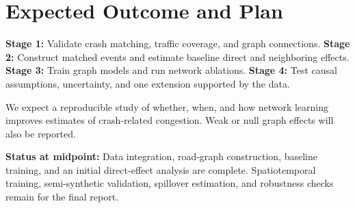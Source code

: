 \documentclass[sigconf,nonacm]{acmart}
\begin{document}
\section{Expected Outcome and Plan}
\textbf{Stage 1:} Validate crash matching, traffic coverage, and graph
connections. \textbf{Stage 2:} Construct matched events and estimate
baseline direct and neighboring effects. \textbf{Stage 3:} Train graph
models and run network ablations. \textbf{Stage 4:} Test causal
assumptions, uncertainty, and one extension supported by the data.

We expect a reproducible study of whether, when, and how network
learning improves estimates of crash-related congestion. Weak or null
graph effects will also be reported.

{\textbf{Status at midpoint:} Data integration,
road-graph construction, baseline training, and an initial direct-effect
analysis are complete. Spatiotemporal training, semi-synthetic
validation, spillover estimation, and robustness checks remain for the
final report.}



\end{document}
